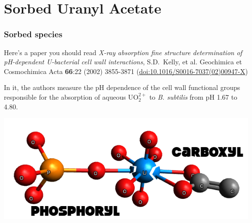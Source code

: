 \documentclass[10pt, xcolor=x11names, compress]{beamer}
\begin{document}
\section{Sorbed Uranyl Acetate}
\label{sec:uace}

\begin{frame}
  \frametitle{Sorbed species}
  \begin{block}{Here's a paper you should read}
    \small
    \textit{X-ray absorption fine structure determination of
      pH-dependent U-bacterial cell wall interactions}, %
    S.D.\ Kelly, et al. Geochimica et Cosmochimica Acta \textbf{66}:22
    (2002) 3855-3871
    (\href{http://dx.doi.org/10.1016/S0016-7037(02)00947-X}
    {\color{Blue2}doi:10.1016/S0016-7037(02)00947-X})
  \end{block}

  \medskip

  In it, the authors measure the pH dependence of the cell wall
  functional groups responsible for the absorption of aqueous
  UO$_2^{2+}$ to \textit{B. subtilis} from pH 1.67 to 4.80.

  \begin{center}
    \includegraphics[width=0.6\linewidth]{images/uranyl.png}
  \end{center}
\end{frame}
\end{document}
